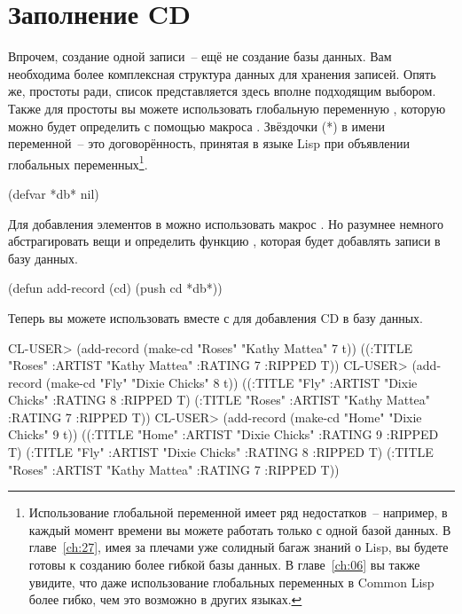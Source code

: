 \section{Заполнение CD}

Впрочем, создание одной записи~-- ещё не создание базы данных. Вам необходима более
комплексная структура данных для хранения записей. Опять же, простоты ради, список
представляется здесь вполне подходящим выбором. Также для простоты вы можете использовать
глобальную переменную , которую можно будет определить с помощью макроса
. Звёздочки (*) в имени переменной~-- это договорённость, принятая в языке
Lisp при объявлении глобальных переменных\footnote{Использование глобальной переменной
  имеет ряд недостатков~-- например, в каждый момент времени вы можете работать только с
  одной базой данных.  В главе~\ref{ch:27}, имея за плечами уже солидный багаж знаний о Lisp,
  вы будете готовы к созданию более гибкой базы данных. В главе~\ref{ch:06} вы также
  увидите, что даже использование глобальных переменных в Common Lisp более гибко, чем это
  возможно в других языках.}.

\begin{myverb}
(defvar *db* nil)
\end{myverb}

Для добавления элементов в  можно использовать макрос . Но
разумнее немного абстрагировать вещи и определить функцию , которая будет
добавлять записи в базу данных.

\begin{myverb}
(defun add-record (cd) (push cd *db*))
\end{myverb}

Теперь вы можете использовать  вместе с  для добавления CD
в базу данных.

\begin{myverb}
   CL-USER> (add-record (make-cd "Roses" "Kathy Mattea" 7 t))
   ((:TITLE "Roses" :ARTIST "Kathy Mattea" :RATING 7 :RIPPED T))
   CL-USER> (add-record (make-cd "Fly" "Dixie Chicks" 8 t))
   ((:TITLE "Fly" :ARTIST "Dixie Chicks" :RATING 8 :RIPPED T)
    (:TITLE "Roses" :ARTIST "Kathy Mattea" :RATING 7 :RIPPED T))
   CL-USER> (add-record (make-cd "Home" "Dixie Chicks" 9 t))
   ((:TITLE "Home" :ARTIST "Dixie Chicks" :RATING 9 :RIPPED T)
    (:TITLE "Fly" :ARTIST "Dixie Chicks" :RATING 8 :RIPPED T)
    (:TITLE "Roses" :ARTIST "Kathy Mattea" :RATING 7 :RIPPED T))
\end{myverb}

